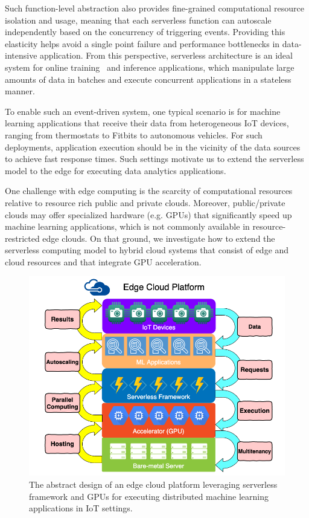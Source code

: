 Such function-level abstraction also provides fine-grained computational resource isolation and usage, meaning that each serverless function can autoscale independently based on the concurrency of triggering events. Providing this elasticity helps avoid a single point failure and performance bottlenecks in data-intensive application. From this perspective, serverless architecture is an ideal system for online training~\cite{ref:online} and inference applications, which manipulate large amounts of data in batches and execute concurrent applications in a stateless manner.

To enable such an event-driven system, one typical scenario is for machine learning applications that receive their data from heterogeneous IoT devices, ranging from thermostats to Fitbits to autonomous vehicles. For such deployments, application execution should be in the vicinity of the data sources to achieve fast response times. Such settings motivate us to extend the serverless model to the edge for executing data analytics applications.

One challenge with edge computing is the scarcity of computational resources relative to resource rich public and private clouds. Moreover, public/private clouds may offer specialized hardware (e.g. GPUs) that significantly speed up machine learning applications, which is not commonly available in resource-restricted edge clouds.
On that ground, we investigate how to extend the serverless computing model to hybrid cloud systems that consist of edge and cloud resources and that integrate GPU acceleration. 

\begin{figure}
    \centering
    \includegraphics[scale=0.3]{figures/edge_platform}
    \caption{The abstract design of an edge cloud platform leveraging serverless framework and GPUs for executing distributed machine learning applications in IoT settings.
\label{fig:edge}}
\end{figure}

